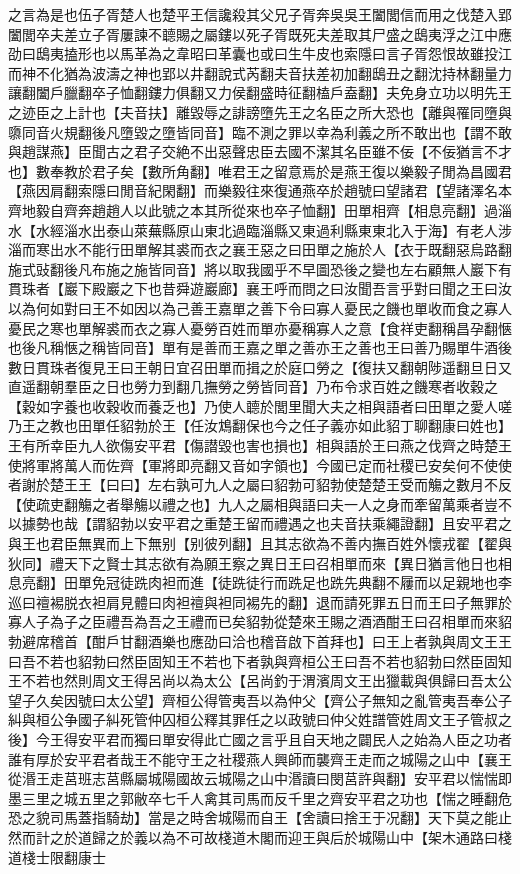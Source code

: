 之言為是也伍子胥楚人也楚平王信讒殺其父兄子胥奔吳吳王闔閭信而用之伐楚入郢闔閭卒夫差立子胥屢諫不聼賜之屬鏤以死子胥既死夫差取其尸盛之鴟夷浮之江中應劭曰鴟夷搕形也以馬革為之韋昭曰革囊也或曰生牛皮也索隱曰言子胥怨恨故雖投江而神不化猶為波濤之神也郢以井翻說式芮翻夫音扶差初加翻鴟丑之翻沈持林翻量力讓翻闔戶臘翻卒子恤翻鏤力俱翻又力侯翻盛時征翻榼戶盍翻】夫免身立功以明先王之迹臣之上計也【夫音扶】離毀辱之誹謗墮先王之名臣之所大恐也【離與罹同墮與隳同音火規翻後凡墮毀之墮皆同音】臨不測之罪以幸為利義之所不敢出也【謂不敢與趙謀燕】臣聞古之君子交絶不出惡聲忠臣去國不潔其名臣雖不佞【不佞猶言不才也】數奉教於君子矣【數所角翻】唯君王之留意焉於是燕王復以樂毅子閒為昌國君【燕因肩翻索隱曰閒音紀閑翻】而樂毅往來復通燕卒於趙號曰望諸君【望諸澤名本齊地毅自齊奔趙趙人以此號之本其所從來也卒子恤翻】田單相齊【相息亮翻】過淄水【水經淄水出泰山萊蕪縣原山東北過臨淄縣又東過利縣東東北入于海】有老人涉淄而寒出水不能行田單解其裘而衣之襄王惡之曰田單之施於人【衣于既翻惡烏路翻施式䜴翻後凡布施之施皆同音】將以取我國乎不早圖恐後之變也左右顧無人巖下有貫珠者【巖下殿巖之下也昔舜遊巖廊】襄王呼而問之曰汝聞吾言乎對曰聞之王曰汝以為何如對曰王不如因以為己善王嘉單之善下令曰寡人憂民之饑也單收而食之寡人憂民之寒也單解裘而衣之寡人憂勞百姓而單亦憂稱寡人之意【食祥吏翻稱昌孕翻愜也後凡稱愜之稱皆同音】單有是善而王嘉之單之善亦王之善也王曰善乃賜單牛酒後數日貫珠者復見王曰王朝日宜召田單而揖之於庭口勞之【復扶又翻朝陟遥翻旦日又直遥翻朝羣臣之日也勞力到翻几撫勞之勞皆同音】乃布令求百姓之饑寒者收穀之【穀如字養也收穀收而養乏也】乃使人聼於閭里聞大夫之相與語者曰田單之愛人嗟乃王之教也田單任貂勃於王【任汝鴆翻保也今之任子義亦如此貂丁聊翻康曰姓也】王有所幸臣九人欲傷安平君【傷譛毀也害也損也】相與語於王曰燕之伐齊之時楚王使將軍將萬人而佐齊【軍將即亮翻又音如字領也】今國已定而社稷已安矣何不使使者謝於楚王王【曰曰】左右孰可九人之屬曰貂勃可貂勃使楚楚王受而觴之數月不反【使疏吏翻觴之者舉觴以禮之也】九人之屬相與語曰夫一人之身而牽留萬乘者豈不以據勢也哉【謂貂勃以安平君之重楚王留而禮遇之也夫音扶乘繩證翻】且安平君之與王也君臣無異而上下無别【别彼列翻】且其志欲為不善内撫百姓外懷戎翟【翟與狄同】禮天下之賢士其志欲有為願王察之異日王曰召相單而來【異日猶言他日也相息亮翻】田單免冠徒跣肉袒而進【徒跣徒行而跣足也跣先典翻不屨而以足親地也李巡曰䄠裼脱衣袒肩見體曰肉袒䄠與袒同裼先的翻】退而請死罪五日而王曰子無罪於寡人子為子之臣禮吾為吾之王禮而已矣貂勃從楚來王賜之酒酒酣王曰召相單而來貂勃避席稽首【酣戶甘翻酒樂也應劭曰洽也稽音啟下首拜也】曰王上者孰與周文王王曰吾不若也貂勃曰然臣固知王不若也下者孰與齊桓公王曰吾不若也貂勃曰然臣固知王不若也然則周文王得呂尚以為太公【呂尚釣于渭濱周文王出獵載與俱歸曰吾太公望子久矣因號曰太公望】齊桓公得管夷吾以為仲父【齊公子無知之亂管夷吾奉公子糾與桓公争國子糾死管仲囚桓公釋其罪任之以政號曰仲父姓譜管姓周文王子管叔之後】今王得安平君而獨曰單安得此亡國之言乎且自天地之闢民人之始為人臣之功者誰有厚於安平君者哉王不能守王之社稷燕人興師而襲齊王走而之城陽之山中【襄王從湣王走莒班志莒縣屬城陽國故云城陽之山中湣讀曰閔莒許與翻】安平君以惴惴即墨三里之城五里之郭敝卒七千人禽其司馬而反千里之齊安平君之功也【惴之睡翻危恐之貌司馬蓋指騎劫】當是之時舍城陽而自王【舍讀曰捨王于况翻】天下莫之能止然而計之於道歸之於義以為不可故棧道木閣而迎王與后於城陽山中【架木通路曰棧道棧士限翻康士